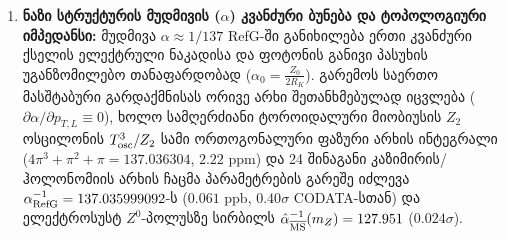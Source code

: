 \documentclass[11pt,a4paper]{article}
\begin{document}
\begin{enumerate}[label=\arabic*.]
\item \textbf{ნაზი სტრუქტურის მუდმივის ($\alpha$) კვანძური ბუნება და ტოპოლოგიური იმპედანსი:} მუდმივა $\alpha \approx 1/137$ RefG-ში განიხილება ერთი კვანძური ქსელის ელექტრული ნაკადისა და ფოტონის განივი პასუხის უგანზომილებო თანაფარდობად ($\alpha_0 = \frac{Z_0}{2 R_K}$). გარემოს საერთო მასშტაბური გარდაქმნისას ორივე არხი შეთანხმებულად იცვლება ($\partial\alpha/\partial p_{T,L} \equiv 0$), ხოლო სამღერძიანი ტოროიდალური მიობიუსის $Z_2$ ოსცილონის $T^3_{\rm osc}/Z_2$ სამი ორთოგონალური ფაზური არხის ინტეგრალი ($4\pi^3 + \pi^2 + \pi = 137.036304$, $2.22\text{ ppm}$) და 24 შინაგანი კაზიმირის/ჰოლონომიის არხის ჩაცმა პარამეტრების გარეშე იძლევა $\alpha_{\rm RefG}^{-1} = 137.035999092$-ს ($0.061\text{ ppb}$, $0.40\sigma$ CODATA-სთან) და ელექტროსუსტ $Z^0$-პოლუსზე სირბილს $\hat{\alpha}_{\overline{\rm MS}}^{-1}(m_Z) = 127.951$ ($0.024\sigma$).

\end{enumerate}
\end{document}
